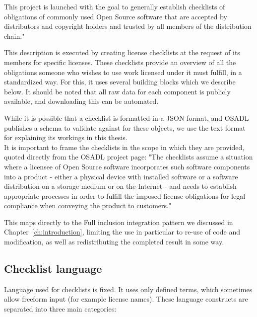 This project is launched with the goal to generally establish checklists of obligations of commonly used Open Source software that are accepted by distributors and copyright holders and trusted by all members of the distribution chain."~\cite{osadl-license-checklists}

This description is executed by creating license checklists at the request of its members for specific licenses. These checklists provide an overview of all the obligations someone who wishes to use work licensed under it must fulfill, in a standardized way. For this, it uses several building blocks which we describe below. It should be noted that all raw data for each component is publicly available, and downloading this can be automated.

While it is possible that a checklist is formatted in a JSON format, and OSADL publishes a schema to validate against for these objects, we use the text format for explaining its workings in this thesis. \\

It is important to frame the checklists in the scope in which they are provided, quoted directly from the OSADL project page: "The checklists assume a situation where a licensee of Open Source software incorporates such software components into a product - either a physical device with installed software or a software distribution on a storage medium or on the Internet - and needs to establish appropriate processes in order to fulfill the imposed license obligations for legal compliance when conveying the product to customers."~\cite{osadl-license-checklists-scope}

This maps directly to the Full inclusion integration pattern we discussed in Chapter~\ref{ch:introduction}, limiting the use in particular to re-use of code and modification, as well as redistributing the completed result in some way.

\subsection{Checklist language}

Language used for checklists is fixed. It uses only defined terms, which sometimes allow freeform input (for example license names). These language constructs are separated into three main categories:

